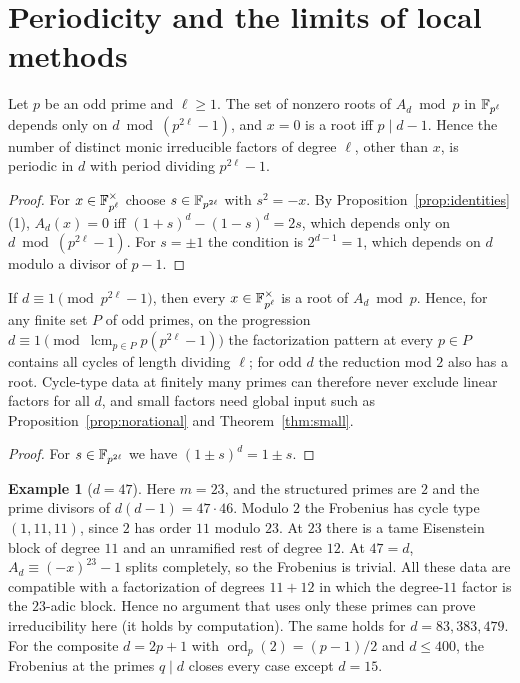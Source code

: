 \documentclass[11pt]{amsart}
\theoremstyle{definition}\newtheorem{definition}[theorem]{Definition}\newtheorem{example}[theorem]{Example}
\theoremstyle{remark}\newtheorem{remark}[theorem]{Remark}
\begin{document}
\section{Periodicity and the limits of local methods}\label{sec:limits}
\begin{proposition}[periodicity]\label{prop:period}
Let $p$ be an odd prime and $\ell\ge1$. The set of nonzero roots of $A_d\bmod p$ in $\mathbb F_{p^\ell}$ depends only on $d\bmod(p^{2\ell}-1)$, and
$x=0$ is a root iff $p\mid d-1$. Hence the number of distinct monic irreducible factors of degree $\ell$, other than $x$, is periodic in $d$ with
period dividing $p^{2\ell}-1$.
\end{proposition}
\begin{proof}
For $x\in\mathbb F_{p^\ell}^\times$ choose $s\in\mathbb F_{p^{2\ell}}$ with $s^2=-x$. By Proposition~\ref{prop:identities}(1), $A_d(x)=0$ iff
$(1+s)^d-(1-s)^d=2s$, which depends only on $d\bmod(p^{2\ell}-1)$. For $s=\pm1$ the condition is $2^{d-1}=1$, which depends on $d$ modulo a
divisor of $p-1$.
\end{proof}

\begin{proposition}[obstruction]\label{prop:obstruction}
If $d\equiv1\pmod{p^{2\ell}-1}$, then every $x\in\mathbb F_{p^\ell}^\times$ is a root of $A_d\bmod p$. Hence, for any finite set $P$ of odd primes, on the
progression $d\equiv1\pmod{\operatorname{lcm}_{p\in P}p(p^{2\ell}-1)}$ the factorization pattern at every $p\in P$ contains all cycles of length
dividing $\ell$; for odd $d$ the reduction mod $2$ also has a root. Cycle-type data at finitely many primes can therefore never exclude linear
factors for all $d$, and small factors need global input such as Proposition~\ref{prop:norational} and Theorem~\ref{thm:small}.
\end{proposition}
\begin{proof}
For $s\in\mathbb F_{p^{2\ell}}$ we have $(1\pm s)^d=1\pm s$.
\end{proof}

\begin{example}[$d=47$]\label{ex:47}
Here $m=23$, and the structured primes are $2$ and the prime divisors of $d(d-1)=47\cdot46$. Modulo $2$ the Frobenius has cycle type $(1,11,11)$,
since $2$ has order $11$ modulo $23$. At $23$ there is a tame Eisenstein block of degree $11$ and an unramified rest of degree $12$. At $47=d$,
$A_d\equiv(-x)^{23}-1$ splits completely, so the Frobenius is trivial. All these data are compatible with a factorization of degrees $11+12$ in
which the degree-$11$ factor is the $23$-adic block. Hence no argument that uses only these primes can prove irreducibility here (it holds by
computation). The same holds for $d=83,383,479$. For the composite $d=2p+1$ with $\operatorname{ord}_p(2)=(p-1)/2$ and $d\le400$, the Frobenius at
the primes $q\mid d$ closes every case except $d=15$.
\end{example}
\end{document}
